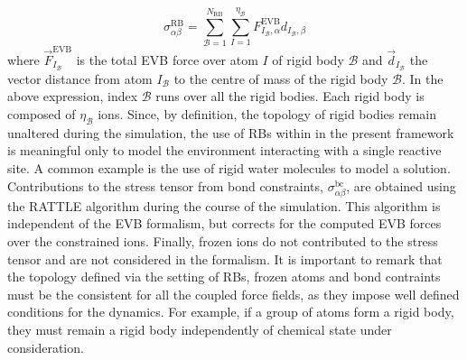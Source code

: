 \begin{equation}\label{eq:stress-total}
\sigma_{\alpha\beta}^{\text{RB}}=\sum_{\mathcal{B}=1}^{N_{\text{RB}}}\sum_{I=1}^{\eta_{\mathcal{B}}} {F}_{I_{\mathcal{B}},\alpha}^{\text{EVB}} d_{I_{\mathcal{B}},\beta}	
\end{equation}
where $\vec{F}^{\text{EVB}}_{I_{\mathcal{B}}}$ is the total EVB force over atom $I$ of rigid body $\mathcal{B}$ and $\vec{d}_{I_{\mathcal{B}}}$ the vector distance from atom $I_{\mathcal{B}}$ to the centre of mass of the rigid body $\mathcal{B}$. In the above expression, index $\mathcal{B}$ runs over all the rigid bodies. Each rigid body is composed of $\eta_{\mathcal{B}}$ ions. Since, by definition, the topology of rigid bodies remain unaltered during the simulation, the use of RBs within in the present framework is meaningful only to model the environment interacting with a single reactive site. A common example is the use of rigid water molecules to model a solution.\\
Contributions to the stress tensor from bond constraints, $\sigma_{\alpha\beta}^{\text{bc}}$, are obtained using the RATTLE algorithm \cite{andersen-83a} during the course of the simulation. This algorithm is independent of the EVB formalism, but corrects for the computed EVB forces over the constrained ions. Finally, frozen ions do not contributed to the stress tensor and are not considered in the formalism. It is important to remark that the topology defined via the setting of RBs, frozen atoms and bond contraints must be the consistent for all the coupled force fields, as they impose well defined conditions for the dynamics. For example, if a group of atoms form a rigid body, they must remain a rigid body independently of chemical state under consideration. 

